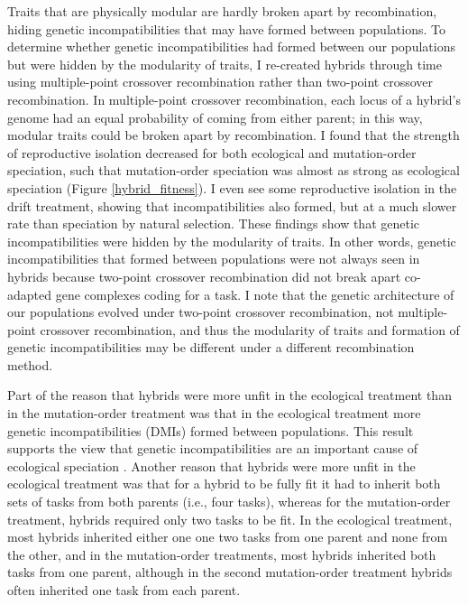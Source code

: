 \begin{doublespace}
Traits that are physically modular
are hardly broken apart by recombination,
hiding genetic incompatibilities
that may have formed between populations.
%
To determine whether genetic incompatibilities
had formed between our populations
but were hidden by the modularity of traits,
I re-created hybrids through time using multiple-point crossover recombination
rather than two-point crossover recombination.
%
In multiple-point crossover recombination,
each locus of a hybrid's genome had an equal probability
of coming from either parent;
in this way, modular traits could be broken apart by recombination.
%
I found that the strength of reproductive isolation
decreased for both ecological and mutation-order speciation,
such that mutation-order speciation
was almost as strong as ecological speciation (Figure \ref{hybrid_fitness}).
%
I even see some reproductive isolation in the drift treatment,
showing that incompatibilities also formed,
but at a much slower rate than speciation by natural selection.
%
These findings show that genetic incompatibilities
were hidden by the modularity of traits.
%
In other words, genetic incompatibilities that formed between populations
were not always seen in hybrids because two-point crossover recombination
did not break apart co-adapted gene complexes coding for a task.
%
I note that the genetic architecture of our populations
evolved under two-point crossover recombination,
not multiple-point crossover recombination,
and thus the modularity of traits
and formation of genetic incompatibilities
may be different under a different recombination method.



Part of the reason that hybrids were more unfit in the ecological treatment
than in the mutation-order treatment was that in the ecological treatment
more genetic incompatibilities (DMIs) formed between populations.
%
This result supports the view that genetic incompatibilities
are an important cause of ecological speciation \citep{run05}.
%
Another reason that hybrids were more unfit in the ecological treatment was
that for a hybrid to be fully fit it had to inherit both sets of tasks from
both parents (i.e., four tasks), whereas for the mutation-order treatment,
hybrids required only two tasks to be fit.
%
In the ecological treatment, most hybrids inherited either one one two tasks
from one parent and none from the other, and in the mutation-order treatments,
most hybrids inherited both tasks from one parent, although in the second
mutation-order treatment hybrids often inherited one task from each parent.




\end{doublespace}
